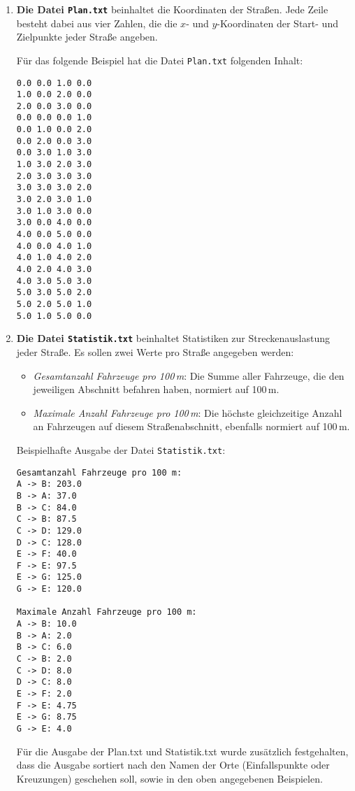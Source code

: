 \begin{enumerate}
  \item \textbf{Die Datei \texttt{Plan.txt}} beinhaltet die Koordinaten der Straßen. Jede Zeile besteht dabei aus vier Zahlen, die die $x$- und $y$-Koordinaten der Start- und Zielpunkte jeder Straße angeben.

  Für das folgende Beispiel hat die Datei \texttt{Plan.txt} folgenden Inhalt:

  \begin{verbatim}
0.0 0.0 1.0 0.0
1.0 0.0 2.0 0.0
2.0 0.0 3.0 0.0
0.0 0.0 0.0 1.0
0.0 1.0 0.0 2.0
0.0 2.0 0.0 3.0
0.0 3.0 1.0 3.0
1.0 3.0 2.0 3.0
2.0 3.0 3.0 3.0
3.0 3.0 3.0 2.0
3.0 2.0 3.0 1.0
3.0 1.0 3.0 0.0
3.0 0.0 4.0 0.0
4.0 0.0 5.0 0.0
4.0 0.0 4.0 1.0
4.0 1.0 4.0 2.0
4.0 2.0 4.0 3.0
4.0 3.0 5.0 3.0
5.0 3.0 5.0 2.0
5.0 2.0 5.0 1.0
5.0 1.0 5.0 0.0
  \end{verbatim}

  \item \textbf{Die Datei \texttt{Statistik.txt}} beinhaltet Statistiken zur Streckenauslastung jeder Straße. Es sollen zwei Werte pro Straße angegeben werden:
  \begin{itemize}
    \item \textit{Gesamtanzahl Fahrzeuge pro 100\,m}: Die Summe aller Fahrzeuge, die den jeweiligen Abschnitt befahren haben, normiert auf 100\,m.
    \item \textit{Maximale Anzahl Fahrzeuge pro 100\,m}: Die höchste gleichzeitige Anzahl an Fahrzeugen auf diesem Straßenabschnitt, ebenfalls normiert auf 100\,m.
  \end{itemize}

  \clearpage
  Beispielhafte Ausgabe der Datei \texttt{Statistik.txt}:

  \begin{verbatim}
Gesamtanzahl Fahrzeuge pro 100 m:
A -> B: 203.0
B -> A: 37.0
B -> C: 84.0
C -> B: 87.5
C -> D: 129.0
D -> C: 128.0
E -> F: 40.0
F -> E: 97.5
E -> G: 125.0
G -> E: 120.0

Maximale Anzahl Fahrzeuge pro 100 m:
A -> B: 10.0
B -> A: 2.0
B -> C: 6.0
C -> B: 2.0
C -> D: 8.0
D -> C: 8.0
E -> F: 2.0
F -> E: 4.75
E -> G: 8.75
G -> E: 4.0
  \end{verbatim}

Für die Ausgabe der Plan.txt und Statistik.txt wurde zusätzlich festgehalten, 
dass die Ausgabe sortiert nach den Namen der Orte (Einfallspunkte oder Kreuzungen) geschehen soll, sowie in den oben angegebenen Beispielen.


\end{enumerate}
